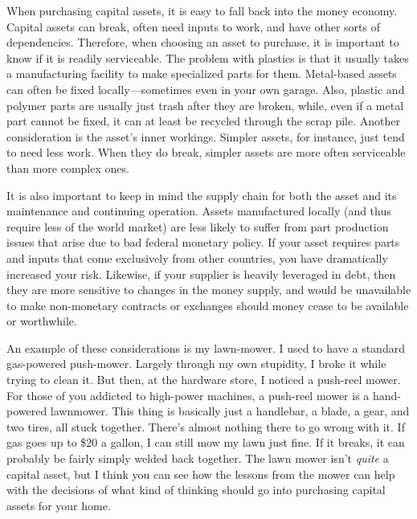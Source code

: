 When purchasing capital assets, it is easy to fall back into the money
economy. Capital assets can break, often need inputs to work, and have
other sorts of dependencies. Therefore, when choosing an asset to
purchase, it is important to know if it is readily serviceable. The
problem with plastics is that it usually takes a manufacturing facility
to make specialized parts for them. Metal-based assets can often be
fixed locally---sometimes even in your own garage. Also, plastic and
polymer parts are usually just trash after they are broken, while, even
if a metal part cannot be fixed, it can at least be recycled through
the scrap pile.  Another consideration is the asset's
inner workings.  Simpler assets, for instance, just tend to need less
work.  When they do break, simpler assets are more often serviceable
than more complex ones.  

It is also important to keep in mind the supply chain for both the asset
and its maintenance and continuing operation.  Assets manufactured
locally (and thus require less of the world market) are less likely to
suffer from part production issues that arise due to bad federal
monetary policy.  If your asset requires parts and inputs that come
exclusively from other countries, you have dramatically increased your
risk.  Likewise, if your supplier is heavily leveraged in debt, then
they are more sensitive to changes in the money supply, and would be
unavailable to make non-monetary contracts or exchanges should money cease to be
available or worthwhile.  

An example of these considerations is my lawn-mower. I used to have a
standard gas-powered push-mower. Largely through my own stupidity, I
broke it while trying to clean it. But then, at the hardware store, I
noticed a push-reel mower. For those of you addicted to high-power
machines, a push-reel mower is a hand-powered lawnmower. This thing is
basically just a handlebar, a blade, a gear, and two tires, all stuck
together. There’s almost nothing there to go wrong with it. If gas goes
up to \$20 a gallon, I can still mow my lawn just fine.  If it breaks,
it can probably be fairly simply welded back together. The lawn mower
isn’t \textit{quite} a capital asset, but I think you can see how the
lessons from the mower can help with the decisions of what kind of
thinking should go into purchasing capital assets for your home.

